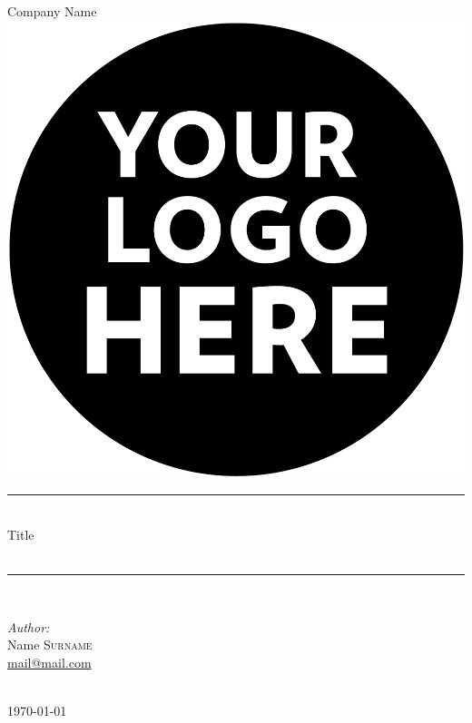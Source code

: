\begin{titlepage}
    \newcommand{\HRule}{\rule{\linewidth}{0.1mm}} %

    \center %

    {\LARGE Company Name}\\[1cm]

    \includegraphics[scale=.12]{images/your-logo.png}\\[2cm] %

    \HRule \\[2.0cm]
    {\Huge Title}\\[0.5cm]
    \\[0.5cm]
    \HRule \\[2.5cm]

    \begin{minipage}{0.5\textwidth}
        \begin{flushleft} \large
        \emph{Author:}\\
        Name \textsc{Surname}\\ %
        \small {\href{mailto:mail@mail.com}{mail@mail.com}}\\ \large
        \end{flushleft}    
    \end{minipage}\\[2cm]

    \vspace*{\fill}
    {\large \today} %

\end{titlepage}